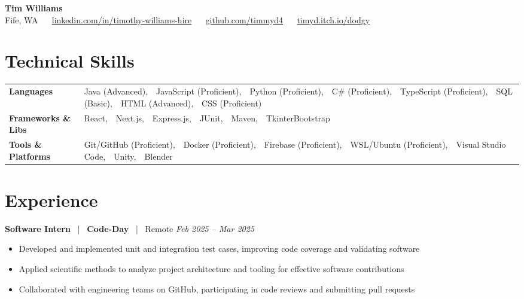 \documentclass[10pt, letterpaper]{article}
\newcommand{\jobhead}[4]{%
  \vspace{5pt}%
  {\bfseries\color{dark}#1}%
  ~{\color{light}|}~%
  {\bfseries\color{navy}#2}%
  ~{\color{light}|}~%
  {\color{light}#3}%
  \hfill{\color{light}\small\textit{#4}}\\[-2pt]%
}
\newcommand{\skillrow}[2]{%
  {\bfseries #1} & #2 \\[2pt]%
}
\begin{document}

\begin{center}
  {\huge\bfseries\color{navy} Tim Williams}\\[4pt]
  {\small\color{light}
    Fife, WA
    ~\textbullet~
    \href{https://linkedin.com/in/timothy-williams-hire}{linkedin.com/in/timothy-williams-hire}
    ~\textbullet~
    \href{https://github.com/timmyd4}{github.com/timmyd4}
    ~\textbullet~
    \href{https://timyd.itch.io/dodgy}{timyd.itch.io/dodgy}
  }
\end{center}

\vspace{2pt}

\section{Technical Skills}

\begin{tabular}{@{}p{1.6in} p{5.2in}@{}}
  \skillrow{Languages}{Java (Advanced),\ \ JavaScript (Proficient),\ \ Python (Proficient),\ \ C\# (Proficient),\ \ TypeScript (Proficient),\ \ SQL (Basic),\ \ HTML (Advanced),\ \ CSS (Proficient)}
  \skillrow{Frameworks \& Libs}{React,\ \ Next.js,\ \ Express.js,\ \ JUnit,\ \ Maven,\ \ TkinterBootstrap}
  \skillrow{Tools \& Platforms}{Git/GitHub (Proficient),\ \ Docker (Proficient),\ \ Firebase (Proficient),\ \ WSL/Ubuntu (Proficient),\ \ Visual Studio Code,\ \ Unity,\ \ Blender}
\end{tabular}

\section{Experience}

\jobhead{Software Intern}{Code-Day}{Remote}{Feb 2025 – Mar 2025}
\begin{itemize}
  \item Developed and implemented unit and integration test cases, improving code coverage and validating software
  \item Applied scientific methods to analyze project architecture and tooling for effective software contributions
  \item Collaborated with engineering teams on GitHub, participating in code reviews and submitting pull requests
\end{itemize}
\end{document}
